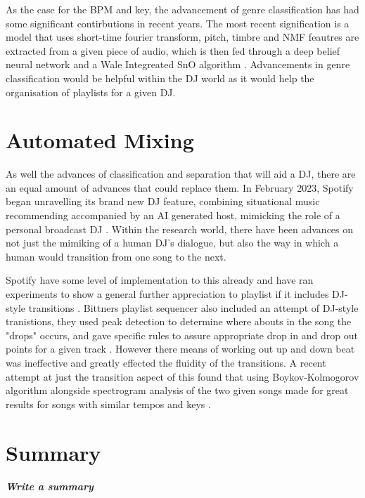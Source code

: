 As the case for the BPM and key, the advancement of genre classification has had some significant contirbutions in recent years. The most recent signification is a model that uses short-time fourier transform, pitch, timbre and NMF feautres are extracted from a given piece of audio, which is then fed through a deep belief neural network and a Wale Integreated SnO algorithm \citep{kumaraswamy_optimal_2022}. Advancements in genre classification would be helpful within the DJ world as it would help the organisation of playlists for a given DJ.

\section{Automated Mixing}
As well the advances of classification and separation that will aid a DJ, there are an equal amount of advances that could replace them. In February 2023, Spotify began unravelling its brand new DJ feature, combining situational music recommending accompanied by an AI generated host, mimicking the role of a personal broadcast DJ \citep{naomi_spotify_2023}. Within the research world, there have been advances on not just the mimiking of a human DJ's dialogue, but also the way in which a human would transition from one song to the next.

Spotify have some level of implementation to this already and have ran experiments to show a general further appreciation to playlist if it includes DJ-style transitions \citep{bittner_automatic_2017}. Bittners playlist sequencer also included an attempt of DJ-style tranistions, they used peak detection to determine where abouts in the song the "drops" occurs, and gave specific rules to assure appropriate drop in and drop out points for a given track \citep{bittner_automatic_2017}.  However there means of working out up and down beat was ineffective and greatly effected the fluidity of the transitions. A recent attempt at just the transition aspect of this found that using Boykov-Kolmogorov algorithm alongside spectrogram analysis of the two given songs made for great results for songs with similar tempos and keys \citep{robinson_automated_2023}.

\section{Summary}
\textbf{\textit{Write a summary}}

